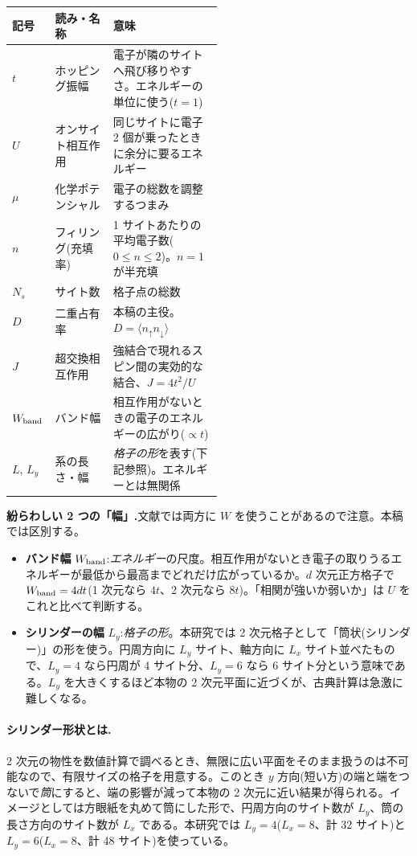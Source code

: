 \documentclass[11pt,a4paper]{ltjsarticle}
\newcommand{\ev}[1]{\langle #1\rangle}
\newcommand{\up}{\uparrow}
\newcommand{\dn}{\downarrow}
\begin{document}
\begin{center}\small
\begin{tabular}{@{}llp{0.52\linewidth}@{}}
\toprule
記号 & 読み・名称 & 意味 \\
\midrule
$t$ & ホッピング振幅 & 電子が隣のサイトへ飛び移りやすさ。エネルギーの単位に使う($t=1$)\\
$U$ & オンサイト相互作用 & 同じサイトに電子 2 個が乗ったときに余分に要るエネルギー \\
$\mu$ & 化学ポテンシャル & 電子の総数を調整するつまみ \\
$n$ & フィリング(充填率) & 1 サイトあたりの平均電子数($0\le n\le2$)。$n=1$ が半充填 \\
$N_s$ & サイト数 & 格子点の総数 \\
$D$ & 二重占有率 & 本稿の主役。$D=\ev{n_\up n_\dn}$ \\
$J$ & 超交換相互作用 & 強結合で現れるスピン間の実効的な結合、$J=4t^2/U$ \\
$W_{\rm band}$ & バンド幅 & 相互作用がないときの電子のエネルギーの広がり($\propto t$)\\
$L$, $L_y$ & 系の長さ・幅 & \emph{格子の形}を表す(下記参照)。エネルギーとは無関係 \\
\bottomrule
\end{tabular}
\end{center}

\begin{cautionbox}
\textbf{紛らわしい 2 つの「幅」.}文献では両方に $W$ を使うことがあるので注意。本稿では区別する。
\begin{itemize}\itemsep2pt
  \item \textbf{バンド幅} $W_{\rm band}$:\emph{エネルギー}の尺度。相互作用がないとき電子の取りうるエネルギーが最低から最高までどれだけ広がっているか。$d$ 次元正方格子で $W_{\rm band}=4dt$(1 次元なら $4t$、2 次元なら $8t$)。「相関が強いか弱いか」は $U$ をこれと比べて判断する。
  \item \textbf{シリンダーの幅} $L_y$:\emph{格子の形}。本研究では 2 次元格子として「筒状(シリンダー)」の形を使う。円周方向に $L_y$ サイト、軸方向に $L_x$ サイト並べたもので、$L_y=4$ なら円周が 4 サイト分、$L_y=6$ なら 6 サイト分という意味である。$L_y$ を大きくするほど本物の 2 次元平面に近づくが、古典計算は急激に難しくなる。
\end{itemize}
\end{cautionbox}

\paragraph{シリンダー形状とは.}2 次元の物性を数値計算で調べるとき、無限に広い平面をそのまま扱うのは不可能なので、有限サイズの格子を用意する。このとき $y$ 方向(短い方)の端と端をつないで\emph{筒}にすると、端の影響が減って本物の 2 次元に近い結果が得られる。イメージとしては方眼紙を丸めて筒にした形で、円周方向のサイト数が $L_y$、筒の長さ方向のサイト数が $L_x$ である。本研究では $L_y=4$($L_x=8$、計 32 サイト)と $L_y=6$($L_x=8$、計 48 サイト)を使っている。
\end{document}
